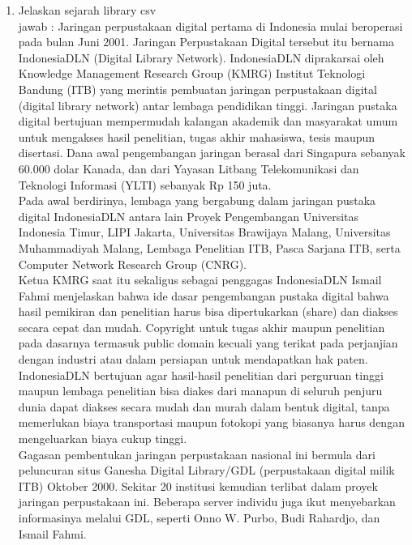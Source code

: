 \begin{enumerate}
\item Jelaskan sejarah library csv\\
jawab : Jaringan perpustakaan digital pertama di Indonesia mulai beroperasi pada bulan Juni 2001.  Jaringan Perpustakaan Digital tersebut itu bernama IndonesiaDLN (Digital Library Network).  IndonesiaDLN diprakarsai oleh Knowledge Management Research Group (KMRG) Institut Teknologi Bandung (ITB) yang merintis pembuatan jaringan perpustakaan digital (digital library network) antar lembaga pendidikan tinggi.  Jaringan pustaka digital bertujuan mempermudah kalangan akademik dan masyarakat umum untuk mengakses hasil penelitian, tugas akhir mahasiswa, tesis maupun disertasi. Dana awal pengembangan jaringan berasal dari Singapura sebanyak 60.000 dolar Kanada, dan dari Yayasan Litbang Telekomunikasi dan Teknologi Informasi (YLTI) sebanyak Rp 150 juta. \\

Pada awal berdirinya, lembaga yang bergabung dalam jaringan pustaka digital IndonesiaDLN antara lain Proyek Pengembangan Universitas Indonesia Timur, LIPI Jakarta, Universitas Brawijaya Malang, Universitas Muhammadiyah Malang, Lembaga Penelitian ITB, Pasca Sarjana ITB, serta Computer Network Research Group (CNRG).\\

Ketua KMRG saat itu sekaligus sebagai penggagas IndonesiaDLN Ismail Fahmi menjelaskan bahwa ide dasar pengembangan pustaka digital bahwa hasil pemikiran dan penelitian harus bisa dipertukarkan (share) dan diakses secara cepat dan mudah. Copyright untuk tugas akhir maupun penelitian pada dasarnya termasuk public domain kecuali yang terikat pada perjanjian dengan industri atau dalam persiapan untuk mendapatkan hak paten. IndonesiaDLN bertujuan agar hasil-hasil penelitian dari perguruan tinggi maupun lembaga penelitian bisa diakes dari manapun di seluruh penjuru dunia dapat diakses secara mudah dan murah dalam bentuk digital, tanpa memerlukan biaya transportasi maupun fotokopi yang biasanya harus dengan mengeluarkan biaya cukup tinggi.\\

Gagasan pembentukan jaringan perpustakaan nasional ini bermula dari peluncuran situs Ganesha Digital Library/GDL (perpustakaan digital milik ITB) Oktober 2000. Sekitar 20 institusi kemudian terlibat dalam proyek jaringan perpustakaan ini. Beberapa server individu juga ikut menyebarkan informasinya melalui GDL, seperti Onno W. Purbo, Budi Rahardjo, dan Ismail Fahmi.\\


\end{enumerate}
